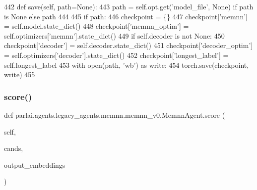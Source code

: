 \begin{DoxyCode}
442     \textcolor{keyword}{def }save(self, path=None):
443         path = self.opt.get(\textcolor{stringliteral}{'model\_file'}, \textcolor{keywordtype}{None}) \textcolor{keywordflow}{if} path \textcolor{keywordflow}{is} \textcolor{keywordtype}{None} \textcolor{keywordflow}{else} path
444 
445         \textcolor{keywordflow}{if} path:
446             checkpoint = \{\}
447             checkpoint[\textcolor{stringliteral}{'memnn'}] = self.model.state\_dict()
448             checkpoint[\textcolor{stringliteral}{'memnn\_optim'}] = self.optimizers[\textcolor{stringliteral}{'memnn'}].state\_dict()
449             \textcolor{keywordflow}{if} self.decoder \textcolor{keywordflow}{is} \textcolor{keywordflow}{not} \textcolor{keywordtype}{None}:
450                 checkpoint[\textcolor{stringliteral}{'decoder'}] = self.decoder.state\_dict()
451                 checkpoint[\textcolor{stringliteral}{'decoder\_optim'}] = self.optimizers[\textcolor{stringliteral}{'decoder'}].state\_dict()
452                 checkpoint[\textcolor{stringliteral}{'longest\_label'}] = self.longest\_label
453             with open(path, \textcolor{stringliteral}{'wb'}) \textcolor{keyword}{as} write:
454                 torch.save(checkpoint, write)
455 
\end{DoxyCode}
\mbox{\label{classparlai_1_1agents_1_1legacy__agents_1_1memnn_1_1memnn__v0_1_1MemnnAgent_a29485cab795b6c8abe0a61d9c6bb87fd}} 
\subsubsection{\texorpdfstring{score()}{score()}}
{\footnotesize\ttfamily def parlai.\+agents.\+legacy\+\_\+agents.\+memnn.\+memnn\+\_\+v0.\+Memnn\+Agent.\+score (\begin{DoxyParamCaption}\item[{}]{self,  }\item[{}]{cands,  }\item[{}]{output\+\_\+embeddings }\end{DoxyParamCaption})}



